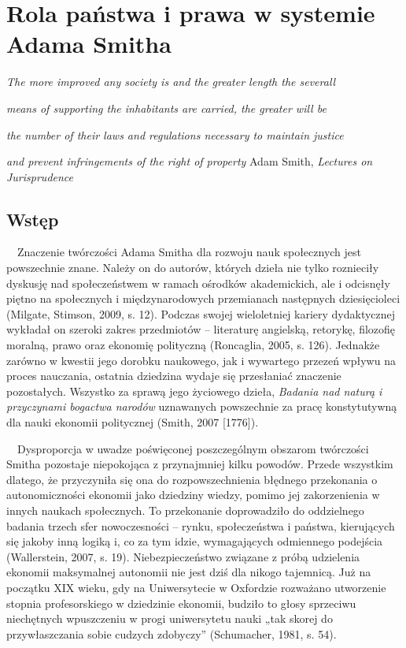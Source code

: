 \documentclass[a4paper]{article}
\title{}
\newcommand\textstyleFootnoteCharacters[1]{\textsuperscript{#1}}
\begin{document}
\section{Rola państwa i prawa w systemie Adama Smitha}
{\raggedleft\itshape
The more improved any society is and the greater length the severall
\par}

{\raggedleft\itshape
means of supporting the inhabitants are carried, the greater will be 
\par}

{\raggedleft\itshape
the number of their laws and regulations necessary to maintain justice 
\par}

{\raggedleft
\textit{and prevent infringements of the right of property}\textstyleFootnoteCharacters{\textit{ }}Adam Smith,
\textit{Lectures on Jurisprudence}\textbf{ }
\par}

\subsection{Wstęp}
\ \ Znaczenie twórczości Adama Smitha dla rozwoju nauk społecznych jest powszechnie znane. Należy on do autorów, których
dzieła nie tylko roznieciły dyskusję nad społeczeństwem w ramach ośrodków akademickich, ale i odcisnęły piętno na
społecznych i międzynarodowych przemianach następnych dziesięcioleci \label{ref:RND1WL5POjFQ5}(Milgate, Stimson, 2009,
s. 12). Podczas swojej wieloletniej kariery dydaktycznej wykładał on szeroki zakres przedmiotów – literaturę angielską,
retorykę, filozofię moralną, prawo oraz ekonomię polityczną \label{ref:RNDAE89MTXX6x}(Roncaglia, 2005, s. 126).
Jednakże zarówno w kwestii jego dorobku naukowego, jak i wywartego przezeń wpływu na proces nauczania, ostatnia
dziedzina wydaje się przesłaniać znaczenie pozostałych. Wszystko za sprawą jego życiowego dzieła, \textit{Badania nad
naturą i przyczynami bogactwa narodów }uznawanych powszechnie za pracę konstytutywną dla nauki ekonomii politycznej
\label{ref:RNDezUk1QStk4}(Smith, 2007 [1776]). 

 \ \ Dysproporcja w uwadze poświęconej poszczególnym obszarom twórczości Smitha pozostaje niepokojąca z przynajmniej
kilku powodów. Przede wszystkim dlatego, że przyczyniła się ona do rozpowszechnienia błędnego przekonania o
autonomiczności ekonomii jako dziedziny wiedzy, pomimo jej zakorzenienia w innych naukach społecznych. To przekonanie
doprowadziło do oddzielnego badania trzech sfer nowoczesności – rynku, społeczeństwa i państwa, kierujących się jakoby
inną logiką i, co za tym idzie, wymagających odmiennego podejścia \label{ref:RNDxEklb6Rjec}(Wallerstein, 2007, s. 19).
Niebezpieczeństwo związane z próbą udzielenia ekonomii maksymalnej autonomii nie jest dziś dla nikogo tajemnicą. Już na
początku XIX wieku, gdy na Uniwersytecie w Oxfordzie rozważano utworzenie stopnia profesorskiego w dziedzinie ekonomii,
budziło to głosy sprzeciwu niechętnych wpuszczeniu w progi uniwersytetu nauki „tak skorej do przywłaszczania sobie
cudzych zdobyczy” \label{ref:RNDq88dfFYNSw}(Schumacher, 1981, s. 54). 
\end{document}
